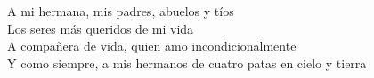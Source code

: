 \thispagestyle{empty}
\vspace*{\fill}
\begin{flushright}
\itshape

A mi hermana, mis padres, abuelos y tíos\\
Los seres más queridos de mi vida\\
A compañera de vida, quien amo incondicionalmente\\
Y como siempre, a mis hermanos de cuatro patas en cielo y tierra\\

\end{flushright}
\vspace*{\fill}
\clearpage
